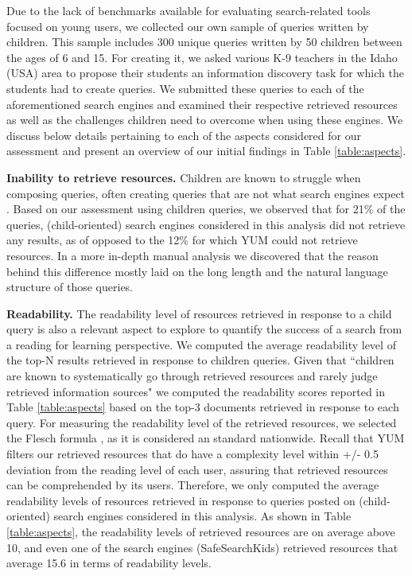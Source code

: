 \documentclass{sig-alternate-05-2015}
\begin{document}
Due to the lack of benchmarks available for evaluating search-related tools focused on young users, we collected our own sample of queries written by children. This sample includes 300 unique queries written by 50 children between the ages of 6 and 15. For creating it, we asked various K-9   teachers in the Idaho (USA) area to propose their students an information discovery task for which the students had to create queries. We submitted these queries to each of the aforementioned search engines and examined their respective retrieved resources as well as the challenges children need to overcome when using these engines. We discuss below details pertaining to each of the aspects  considered for our assessment and present an overview of our initial findings  in Table \ref{table:aspects}. 





\noindent
\textbf{Inability to retrieve resources.} Children are known to struggle when composing queries, often creating queries that are not what search engines expect \cite{Rie16}. Based on our assessment using children queries, we observed that for  21\% of the queries, (child-oriented) search engines considered in this analysis did not retrieve any results, as of opposed to the 12\% for which YUM could not retrieve resources. In a more in-depth manual analysis we discovered that the reason behind this difference mostly laid on the long length and the natural language structure of those queries.

\noindent
\textbf{Readability.} The readability level of resources retrieved in response to a child query is also a relevant aspect to explore to quantify the success of a search from a reading for learning perspective. We computed the average readability level of the top-N results retrieved in response to children queries. Given that ``children are known to systematically go through retrieved resources and rarely judge retrieved information sources" \cite{Rie16} we computed the readability scores reported in Table \ref{table:aspects} based on the top-3 documents retrieved in response to each query. For measuring the readability level of the retrieved resources, we selected the Flesch formula \cite{Fle48}, as it is considered an standard nationwide. Recall that YUM filters our retrieved resources that do have a complexity level within +/- 0.5 deviation from the reading level of each user, assuring that retrieved resources can be comprehended by its users.   Therefore, we only computed the average readability levels of resources retrieved in response to queries posted on (child-oriented) search engines considered in this analysis. As shown in Table \ref{table:aspects}, the readability levels of retrieved resources are on average above 10, and even one of the search engines (SafeSearchKids) retrieved resources that average 15.6 in terms of readability levels. 
\end{document}
